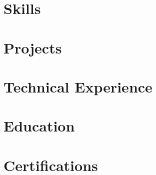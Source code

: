 \documentclass[letter,11pt]{article}
\begin{document}
\thispagestyle{firstpage}



\section{Skills}


\section{Projects}


\section{Technical Experience}


\section{Education}


\section{Certifications}

\end{document}
